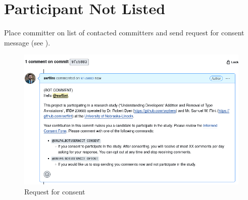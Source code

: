 \documentclass[paper=letter,fontsize=11pt,DIV=14]{scrartcl}
\begin{document}
\section{Participant Not Listed}
\label{not-listed}

Place committer on list of contacted committers and send request for consent message (see ).

\begin{figure}[h]
\centering
\includegraphics[width=\linewidth,frame]{./request-consent.png}
\caption{Request for consent}
\label{fig:request-consent}
\end{figure}
\end{document}
